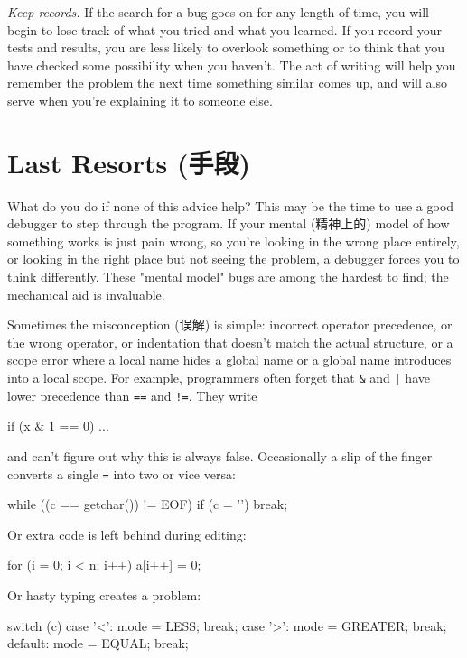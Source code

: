 \emph{Keep records.} If the search for a bug goes on for any length of
time, you will begin to lose track of what you tried and what you learned.
If you record your tests and results, you are less likely to overlook
something or to think that you have checked some possibility when you
haven't. The act of writing will help you remember the problem the next
time something similar comes up, and will also serve when you're explaining
it to someone else.

\section{Last Resorts (手段)}
\label{sec:last_resorts}
What do you do if none of this advice help? This may be the time to use a
good debugger to step through the program. If your mental (精神上的) model
of how something works is just pain wrong, so you're looking in the wrong
place entirely, or looking in the right place but not seeing the problem, a
debugger forces you to think differently. These "mental model" bugs are
among the hardest to find; the mechanical aid is invaluable.

Sometimes the misconception (误解) is simple: incorrect operator
precedence, or the wrong operator, or indentation that doesn't match the
actual structure, or a scope error where a local name hides a global name
or a global name introduces into a local scope. For example, programmers
often forget that \verb'&' and \verb'|' have lower precedence than
\verb'==' and \verb'!='. They write
\begin{badcode}
    if (x & 1 == 0)
        ...
\end{badcode}
and can't figure out why this is always false. Occasionally a slip of the
finger converts a single \verb'=' into two or vice versa:
\begin{badcode}
    while ((c == getchar()) != EOF)
        if (c = '\n')
            break;
\end{badcode}
Or extra code is left behind during editing:
\begin{badcode}
    for (i = 0; i < n; i++)
        a[i++] = 0;
\end{badcode}
Or hasty typing creates a problem:
\begin{badcode}
    switch (c) {
        case '<':
            mode = LESS;
            break;
        case '>':
            mode = GREATER;
            break;
        default:
            mode = EQUAL;
            break;
    }
\end{badcode}

